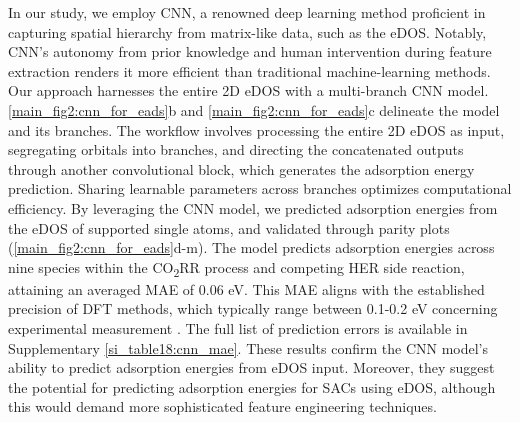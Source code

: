 In our study, we employ CNN, a renowned deep learning method proficient in capturing spatial hierarchy from matrix-like data, such as the eDOS.
Notably, CNN's autonomy from prior knowledge and human intervention during feature extraction renders it more efficient than traditional machine-learning methods.
Our approach harnesses the entire 2D eDOS with a multi-branch CNN model.
\cref{main_fig2:cnn_for_eads}b and \cref{main_fig2:cnn_for_eads}c delineate the model and its branches.
The workflow involves processing the entire 2D eDOS as input, segregating orbitals into branches, and directing the concatenated outputs through another convolutional block, which generates the adsorption energy prediction.
Sharing learnable parameters across branches optimizes computational efficiency.
By leveraging the CNN model, we predicted adsorption energies from the eDOS of supported single atoms, and validated through parity plots (\cref{main_fig2:cnn_for_eads}d-m).
The model predicts adsorption energies across nine species within the CO\textsubscript{2}RR process and competing HER side reaction, attaining an averaged MAE of 0.06 eV.
This MAE aligns with the established precision of DFT methods, which typically range between 0.1-0.2 eV concerning experimental measurement \cite{wellendorff2015benchmark, kirklin2015open, lejaeghere2016reproducibility}.
The full list of prediction errors is available in Supplementary \cref{si_table18:cnn_mae}.
These results confirm the CNN model's ability to predict adsorption energies from eDOS input.
Moreover, they suggest the potential for predicting adsorption energies for SACs using eDOS, although this would demand more sophisticated feature engineering techniques.

